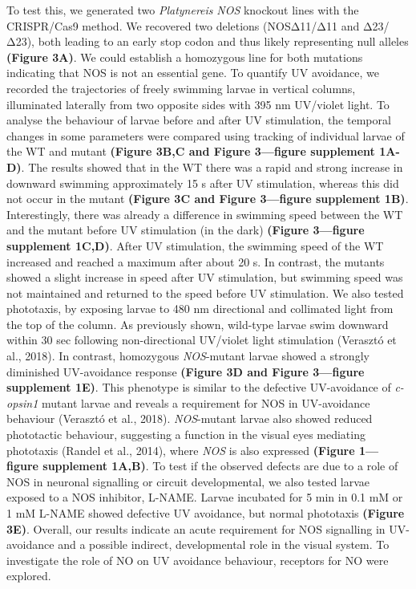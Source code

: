 \documentclass[
  10pt,
  onecolumn]{article}
\begin{document}
To test this, we generated two \emph{Platynereis} \emph{NOS} knockout
lines with the CRISPR/Cas9 method. We recovered two deletions
(NOSΔ11/Δ11 and Δ23/Δ23), both leading to an early stop codon and thus
likely representing null alleles \textbf{(Figure 3A)}. We could
establish a homozygous line for both mutations indicating that NOS is
not an essential gene. To quantify UV avoidance, we recorded the
trajectories of freely swimming larvae in vertical columns, illuminated
laterally from two opposite sides with 395 nm UV/violet light. To
analyse the behaviour of larvae before and after UV stimulation, the
temporal changes in some parameters were compared using tracking of
individual larvae of the WT and mutant \textbf{(Figure 3B,C and Figure
3---figure supplement 1A-D)}. The results showed that in the WT there
was a rapid and strong increase in downward swimming approximately 15 s
after UV stimulation, whereas this did not occur in the mutant
\textbf{(Figure 3C and Figure 3---figure supplement 1B)}. Interestingly,
there was already a difference in swimming speed between the WT and the
mutant before UV stimulation (in the dark) \textbf{(Figure 3---figure
supplement 1C,D)}. After UV stimulation, the swimming speed of the WT
increased and reached a maximum after about 20 s. In contrast, the
mutants showed a slight increase in speed after UV stimulation, but
swimming speed was not maintained and returned to the speed before UV
stimulation. We also tested phototaxis, by exposing larvae to 480 nm
directional and collimated light from the top of the column. As
previously shown, wild-type larvae swim downward within 30 sec following
non-directional UV/violet light stimulation (Verasztó et al., 2018). In
contrast, homozygous \emph{NOS}-mutant larvae showed a strongly
diminished UV-avoidance response \textbf{(Figure 3D and Figure
3---figure supplement 1E)}. This phenotype is similar to the defective
UV-avoidance of \emph{c-opsin1} mutant larvae and reveals a requirement
for NOS in UV-avoidance behaviour (Verasztó et al., 2018).
\emph{NOS}-mutant larvae also showed reduced phototactic behaviour,
suggesting a function in the visual eyes mediating phototaxis (Randel et
al., 2014), where \emph{NOS} is also expressed \textbf{(Figure
1---figure supplement 1A,B)}. To test if the observed defects are due to
a role of NOS in neuronal signalling or circuit developmental, we also
tested larvae exposed to a NOS inhibitor, L-NAME. Larvae incubated for 5
min in 0.1 mM or 1 mM L-NAME showed defective UV avoidance, but normal
phototaxis \textbf{(Figure 3E)}. Overall, our results indicate an acute
requirement for NOS signalling in UV-avoidance and a possible indirect,
developmental role in the visual system. To investigate the role of NO
on UV avoidance behaviour, receptors for NO were explored.
\end{document}
